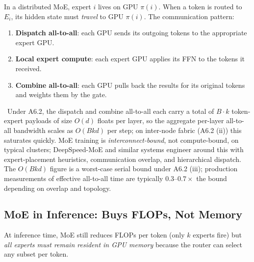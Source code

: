 In a distributed MoE, expert $i$ lives on GPU $\pi(i)$. When a token
is routed to $E_i$, its hidden state must \emph{travel} to GPU
$\pi(i)$. The communication pattern:
\begin{enumerate}
  \item \textbf{Dispatch all-to-all}: each GPU sends its outgoing
        tokens to the appropriate expert GPU.
  \item \textbf{Local expert compute}: each expert GPU applies its
        FFN to the tokens it received.
  \item \textbf{Combine all-to-all}: each GPU pulls back the results
        for its original tokens and weights them by the gate.
\end{enumerate}
\Assum\ Under A6.2, the dispatch and combine all-to-all each carry a
total of $B \cdot k$ token-expert payloads of size $O(d)$ floats per
layer, so the aggregate per-layer all-to-all bandwidth scales as
$O(B k d)$ per step; on inter-node fabric (A6.2 (ii)) this saturates
quickly. MoE training is \emph{interconnect-bound}, not
compute-bound, on typical clusters; DeepSpeed-MoE
\citep{rajbhandari2022deepspeedmoe} and similar systems engineer
around this with expert-placement heuristics, communication
overlap, and hierarchical dispatch. The $O(B k d)$ figure is a
worst-case serial bound under A6.2 (iii); production measurements of
effective all-to-all time are typically $0.3$--$0.7\times$ the bound
depending on overlap and topology.

\subsection{MoE in Inference: Buys FLOPs, Not Memory}

At inference time, MoE still reduces FLOPs per token (only $k$
experts fire) but \emph{all experts must remain resident in GPU
memory} because the router can select any subset per token.

